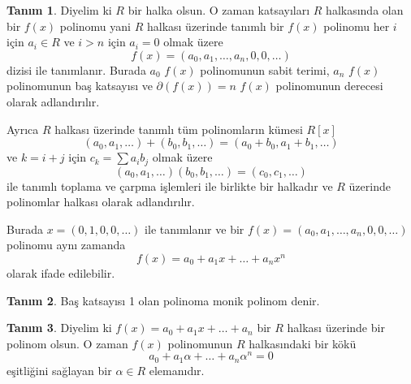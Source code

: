 \documentclass[draft]{article}
\theoremstyle{definition}
\newtheorem{defn}{Tanım}[section]
\theoremstyle{remark}
\begin{document}
        	\begin{defn}
        	    Diyelim ki $R$ bir halka olsun. O zaman katsayıları $R$ halkasında olan bir $f(x)$ polinomu yani $R$ halkası üzerinde tanımlı bir $f(x)$ polinomu her $i$ için $a_i \in R$ ve $i > n$ için $a_i = 0$ olmak üzere
        	    \begin{equation*}
        	        f(x) = (a_0, a_1, \dots, a_n, 0, 0, \dots)
        	    \end{equation*}
        	    dizisi ile tanımlanır. Burada $a_0$ $f(x)$ polinomunun sabit terimi, $a_n$ $f(x)$ polinomunun baş katsayısı ve $\partial(f(x)) = n$ $f(x)$ polinomunun derecesi olarak adlandırılır.\par
        	    Ayrıca $R$ halkası üzerinde tanımlı tüm polinomların kümesi $R[x]$
        	    \begin{equation*}
        	        (a_0, a_1, \dots) + (b_0, b_1, \dots) = (a_0 + b_0, a_1 + b_1, \dots) 
        	    \end{equation*}
        	    ve $k = i + j$ için $c_k = \sum{a_ib_j}$ olmak üzere
        	    \begin{equation*}
        	        (a_0, a_1, \dots)(b_0, b_1, \dots) = (c_0, c_1, \dots)
        	    \end{equation*}
        	    ile tanımlı toplama ve çarpma işlemleri ile birlikte bir halkadır ve $R$ üzerinde polinomlar halkası olarak adlandırılır.\par
        	    Burada $x = (0, 1, 0, 0, \dots)$ ile tanımlanır ve bir $f(x) = (a_0, a_1, \dots, a_n, 0, 0, \dots)$ polinomu aynı zamanda
        	    \begin{equation*}
        	        f(x) = a_0 + a_1x + \dots + a_nx^n
        	    \end{equation*}
        	    olarak ifade edilebilir.
        	\end{defn}
        	
        	\begin{defn}
        	    Baş katsayısı 1 olan polinoma monik polinom denir.
        	\end{defn}
        		
        	\begin{defn}
        	    Diyelim ki $f(x) = a_0 + a_1x + \dots + a_n$ bir $R$ halkası üzerinde bir polinom olsun. O zaman $f(x)$ polinomunun $R$ halkasındaki bir kökü
        	    \begin{equation*}
    			    a_0 + a_1\alpha + \dots + a_n\alpha^n = 0
    			\end{equation*}
    			eşitliğini sağlayan bir $\alpha \in R$ elemanıdır.
    		\end{defn}
    		
\end{document}
